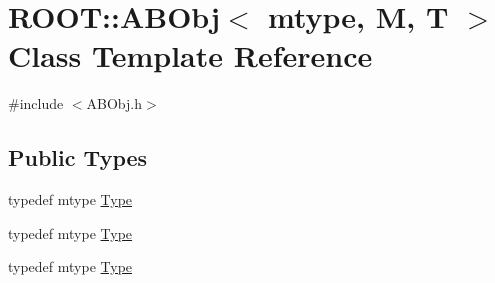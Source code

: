 \hypertarget{classROOT_1_1Minuit2_1_1ABObj}{}\section{R\+O\+OT\+:\+:A\+B\+Obj$<$ mtype, M, T $>$ Class Template Reference}
\label{classROOT_1_1Minuit2_1_1ABObj}


{\ttfamily \#include $<$A\+B\+Obj.\+h$>$}

\subsection*{Public Types}
\begin{DoxyCompactItemize}
\item 
typedef mtype \mbox{\hyperlink{classROOT_1_1Minuit2_1_1ABObj_aaa1bd50c134682a0713ce549f31e85ab}{Type}}
\item 
typedef mtype \mbox{\hyperlink{classROOT_1_1Minuit2_1_1ABObj_aaa1bd50c134682a0713ce549f31e85ab}{Type}}
\item 
typedef mtype \mbox{\hyperlink{classROOT_1_1Minuit2_1_1ABObj_aaa1bd50c134682a0713ce549f31e85ab}{Type}}
\end{DoxyCompactItemize}

